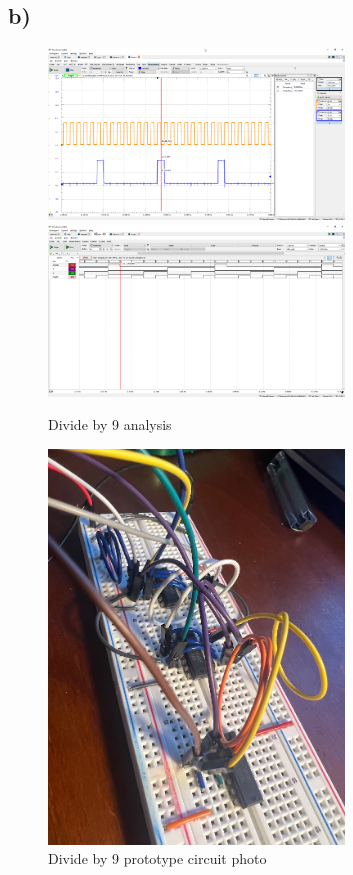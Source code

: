\documentclass{article}
\begin{document}
	\subsection*{b)}
	
	\begin{figure}[H]
	    \centering
	    \includegraphics[width=0.7\textwidth]{2b-wfm}
	    \includegraphics[width=0.7\textwidth]{2b-2-wfm}
	    \caption{Divide by 9 analysis}
	\end{figure}
	
	\begin{figure}[H]
	    \centering
	    \includegraphics[width=0.7\textwidth]{2b-photo}
	    \caption{Divide by 9 prototype circuit photo}
	\end{figure}
	
\end{document}
